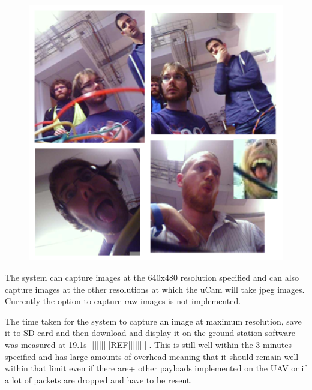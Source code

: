 \begin{figure}[H]
        \centering
        \includegraphics[width=1.00\textwidth]{figures/SampleImages1.png}
        \label{fig:Samples1}
\end{figure}

The system can capture images at the 640x480 resolution specified and can also capture images at the other resolutions at which the uCam will take jpeg images. Currently the option to capture raw images is not implemented.

The time taken for the system to capture an image at maximum resolution, save it to SD-card and then download and display it on the ground station software was measured at 19.1s |||||||||REF|||||||||. This is still well within the 3 minutes specified and has large amounts of overhead meaning that it should remain well within that limit even if there are+ other payloads implemented on the UAV or if a lot of packets are dropped and have to be resent.